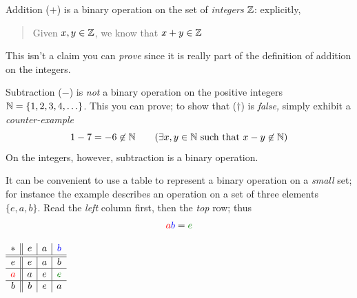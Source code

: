 \begin{examples}{}{}
\exstart Addition ($+$) is a binary operation on the set of \emph{integers} $\mathbb{Z}$: explicitly,\vspace{-2pt}
\begin{enumerate}\setcounter{enumi}{1}\itemsep2pt
\item[]\begin{quote}
Given $x,y\in\mathbb{Z}$, we know that $x+y\in\mathbb{Z}$
\end{quote}
\smallskip
This isn't a claim you can \emph{prove} since it is really part of the definition of addition on the integers.

  \item  Subtraction ($-$) is \emph{not} a binary operation on the positive integers $\mathbb{N}=\{1,2,3,4,\ldots\}$. This you can prove; to show that ($\dag$) is \emph{false,} simply exhibit a \emph{counter-example}
  \[1-7=-6\not\in\N\tag{$\exists x,y\in\N$ such that $x-y\not\in\N$}\]
  On the integers, however, subtraction is a binary operation.
  
  
 	\begin{minipage}[t]{0.79\linewidth}\vspace{0pt}
  \item\label{ex:table1} It can be convenient to use a table to represent a binary operation on a \emph{small} set; for instance the example describes an operation on a set of three elements $\{e,a,b\}$. Read the  \emph{left} column first, then the \emph{top} row; thus
  \[\textcolor{red}{a}\textcolor{blue}{b}=\textcolor{Green}{e}\]
	\end{minipage}\begin{minipage}[t]{0.2\linewidth}\vspace{0pt}
	\flushright $\begin{array}{c||c|c|c}
			* & e & a & \textcolor{blue}{b}\\\hline\hline
			e & e & a & b\\\hline
			\textcolor{red}{a} & a & e & \textcolor{Green}{e}\\\hline
			b & b & e & a
		\end{array}$
	\end{minipage}
\end{enumerate}
\end{examples}

